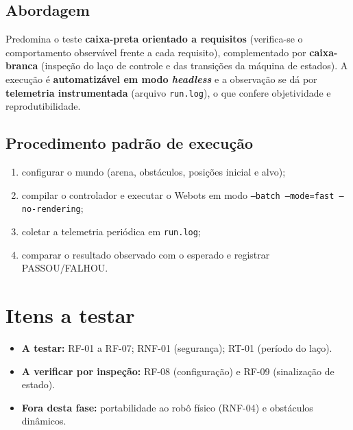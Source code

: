 \subsection{Abordagem}
Predomina o teste \textbf{caixa-preta orientado a requisitos} (verifica-se o comportamento observável frente a cada requisito), complementado por \textbf{caixa-branca} (inspeção do laço de controle e das transições da máquina de estados). A execução é \textbf{automatizável em modo \emph{headless}} e a observação se dá por \textbf{telemetria instrumentada} (arquivo \texttt{run.log}), o que confere objetividade e reprodutibilidade.

\subsection{Procedimento padrão de execução}
\begin{enumerate}[noitemsep,topsep=2pt]
  \item configurar o mundo (arena, obstáculos, posições inicial e alvo);
  \item compilar o controlador e executar o Webots em modo \texttt{--batch --mode=fast --no-rendering};
  \item coletar a telemetria periódica em \texttt{run.log};
  \item comparar o resultado observado com o esperado e registrar PASSOU/FALHOU.
\end{enumerate}

\section{Itens a testar}
\begin{itemize}[noitemsep,topsep=2pt]
  \item \textbf{A testar:} RF-01 a RF-07; RNF-01 (segurança); RT-01 (período do laço).
  \item \textbf{A verificar por inspeção:} RF-08 (configuração) e RF-09 (sinalização de estado).
  \item \textbf{Fora desta fase:} portabilidade ao robô físico (RNF-04) e obstáculos dinâmicos.
\end{itemize}

